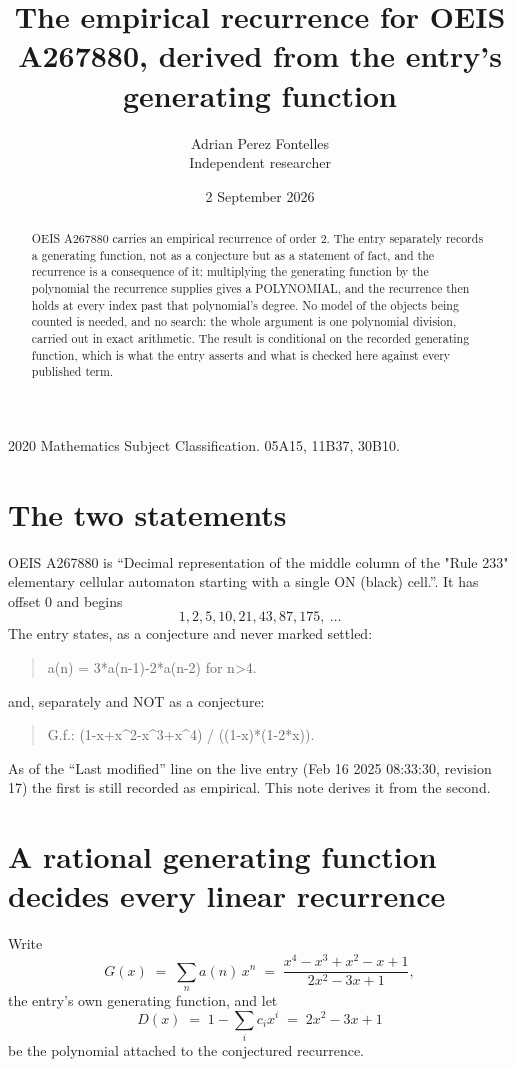 \documentclass[11pt,a4paper]{article}
\title{The empirical recurrence for OEIS A267880, derived from the entry's generating function}
\author{Adrian Perez Fontelles\\ \small Independent researcher}
\date{2 September 2026}
\theoremstyle{plain}
\theoremstyle{definition}
\begin{document}
\maketitle

\begin{abstract}
OEIS A267880 carries an empirical recurrence of order $2$. The entry separately records a
generating function, not as a conjecture but as a statement of fact, and the recurrence is a
consequence of it: multiplying the generating function by the polynomial the recurrence
supplies gives a POLYNOMIAL, and the recurrence then holds at every index past that
polynomial's degree. No model of the objects being counted is needed, and no search: the
whole argument is one polynomial division, carried out in exact arithmetic. The result is
conditional on the recorded generating function, which is what the entry asserts and what is
checked here against every published term.
\end{abstract}

\noindent\small 2020 Mathematics Subject Classification. 05A15, 11B37, 30B10.\normalsize

\section{The two statements}

OEIS A267880 is ``Decimal representation of the middle column of the "Rule 233" elementary cellular automaton starting with a single ON (black) cell.''. It has offset $0$ and begins
\[
1, 2, 5, 10, 21, 43, 87, 175,\ \dots
\]
The entry states, as a conjecture and never marked settled:
\begin{quote}
a(n) = 3*a(n-1)-2*a(n-2) for n>4.
\end{quote}
and, separately and NOT as a conjecture:
\begin{quote}
G.f.: (1-x+x\^{}2-x\^{}3+x\^{}4) / ((1-x)*(1-2*x)).
\end{quote}
As of the ``Last modified'' line on the live entry (Feb 16 2025 08:33:30, revision 17) the first is still
recorded as empirical. This note derives it from the second.

\section{A rational generating function decides every linear recurrence}

Write
\[
G(x)\;=\;\sum_{n}a(n)\,x^{n}\;=\;\frac{x^{4} - x^{3} + x^{2} - x + 1}{2 x^{2} - 3 x + 1},
\]
the entry's own generating function, and let
\[
D(x)\;=\;1-\sum_i c_i x^{i}\;=\;2 x^{2} - 3 x + 1
\]
be the polynomial attached to the conjectured recurrence.
\end{document}
